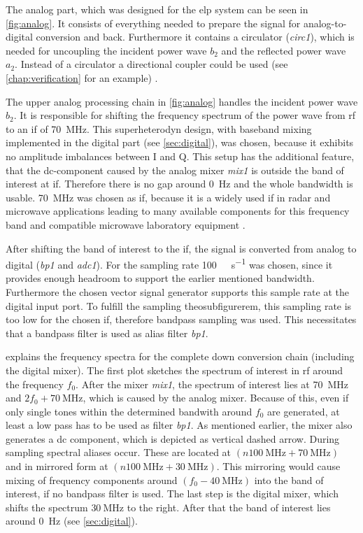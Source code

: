\documentclass[12pt,a4paper,parskip=full,abstract=true,BCOR=12mm,twoside,open=right]{scrreprt}
\def\device#1{\textit{#1}}
\begin{document}
The analog part, which was designed for the \gls{elp} system can be seen in
\cref{fig:analog}. It consists of everything needed to prepare the signal
for analog-to-digital conversion and back. Furthermore it contains a
circulator (\device{circ1}), which is needed for uncoupling the
incident power wave $b_2$ and the reflected power wave $a_2$. Instead of a
circulator a directional coupler could be used (see
\cref{chap:verification} for an example) \cite{ghannouchi_load-pull_2013}.

The upper analog processing chain in \cref{fig:analog} handles the
incident power wave $b_2$. It is responsible for shifting the frequency spectrum
of the power wave from \gls{rf} to an \gls{if} of \SI{70}{\mega\hertz}. This
superheterodyn design, with baseband mixing implemented in the digital
part (see \cref{sec:digital}), was chosen, because it exhibits no amplitude
imbalances between I and Q. This setup has the additional feature, that
the \gls{dc}-component caused by the analog mixer \device{mix1} is outside the
band of interest at \gls{if}. Therefore there is no gap around \SI{0}{\hertz}
and the whole bandwidth is usable. \SI{70}{\mega\hertz} was chosen as \gls{if},
because it is a widely used \gls{if} in radar and microwave applications
\cite{tozer_broadcast_2004,ahamed_design_1997,whitaker_rf_2002,penttinen_telecommunications_2015}
leading to many available components for this frequency band and compatible microwave
laboratory equipment \cite{agilent_h70}.

After shifting the band of interest to the \gls{if}, the signal is converted from
analog to digital (\device{bp1} and \device{adc1}). For the sampling rate
\SI{100}{\mega\samples\per\second} was chosen, since it provides enough headroom to
support the earlier mentioned bandwidth. Furthermore the chosen vector signal generator supports this sample rate
at the digital input port. To fulfill the sampling theosubfigurerem, this sampling rate is too low for the chosen
\gls{if}, therefore bandpass sampling was used. This necessitates that a bandpass
filter is used as alias filter \device{bp1}.

 explains the frequency spectra for the complete down
conversion chain (including the digital mixer). The first plot sketches the
spectrum of interest in \gls{rf} around the frequency $f_0$. After the mixer \device{mix1}, the
spectrum of interest lies at \SI{70}{\mega\hertz} and $2f_0 + \SI{70}{\mega\hertz}$,
which is caused by the analog mixer. Because of this, even if only single tones
within the determined bandwith around $f_0$ are generated, at least a low pass
has to be used as filter \device{bp1}. As mentioned earlier, the mixer also generates a \gls{dc} component, which is depicted as vertical dashed arrow. During sampling spectral aliases occur. These
are located at $(n \SI{100}{\mega\hertz} + \SI{70}{\mega\hertz})$ and in mirrored form at
$(n \SI{100}{\mega\hertz} + \SI{30}{\mega\hertz})$. This mirroring would cause mixing
of frequency components around $(f_0 - \SI{40}{\mega\hertz})$ into the band of interest,
if no bandpass filter is used. The last step is the digital mixer, which shifts
the spectrum $\SI{30}{\mega\hertz}$ to the right. After that the band of interest lies around
\SI{0}{\hertz} (see \cref{sec:digital}).
\end{document}
